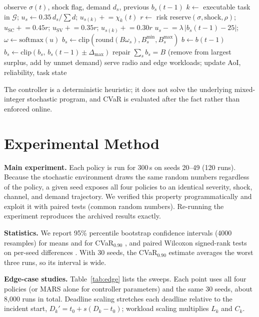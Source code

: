 \documentclass[conference]{IEEEtran}
\begin{document}
\begin{algorithm}[t]
\caption{One MARS control step}
\label{alg:mars}
\small
\begin{algorithmic}[1]
\State observe $\sigma(t)$, shock flag, demand $d_s$, previous $b_s(t-1)$
\State $k\gets$ executable task in $\mathcal{G}$; $u_s\gets 0.35\,d_s/\sum d$; $u_{s(k)}\mathrel{+}=\chi_k(t)$
\State $r\gets$ risk reserve$(\sigma,\text{shock},\rho)$; $u_{\mathrm{SC}}\mathrel{+}=0.45r$; $u_{\mathrm{SV}}\mathrel{+}=0.35r$; $u_{s(k)}\mathrel{+}=0.30r$
\State $u_s\mathrel{-}=\lambda\,|b_s(t-1)-25|$;\quad $\omega\gets\mathrm{softmax}(u)$
\State $b_s\gets\mathrm{clip}(\mathrm{round}(B\omega_s),B_s^{\min},B_s^{\max})$
 $b\gets b(t-1)$
\Else\ $b_s\gets\mathrm{clip}(b_s,\,b_s(t-1)\pm\Delta_{\max})$
\EndIf
\State repair $\sum_s b_s=B$ (remove from largest surplus, add by unmet demand)
\State serve radio and edge workloads; update AoI, reliability, task state
\end{algorithmic}
\end{algorithm}

The controller is a deterministic heuristic; it does not solve the underlying mixed-integer stochastic program, and CVaR is evaluated after the fact rather than enforced online.

\section{Experimental Method}
\textbf{Main experiment.} Each policy is run for 300\,s on seeds 20--49 (120 runs). Because the stochastic environment draws the same random numbers regardless of the policy, a given seed exposes all four policies to an identical severity, shock, channel, and demand trajectory. We verified this property programmatically and exploit it with paired tests (common random numbers). Re-running the experiment reproduces the archived results exactly.

\textbf{Statistics.} We report 95\% percentile bootstrap confidence intervals (4000 resamples) for means and for CVaR$_{0.90}$ \cite{bootstrap}, and paired Wilcoxon signed-rank tests on per-seed differences \cite{wilcoxon}. With 30 seeds, the CVaR$_{0.90}$ estimate averages the worst three runs, so its interval is wide.

\textbf{Edge-case studies.} Table~\ref{tab:edge} lists the sweeps. Each point uses all four policies (or MARS alone for controller parameters) and the same 30 seeds, about 8{,}000 runs in total. Deadline scaling stretches each deadline relative to the incident start, $D_k'=t_0+s(D_k-t_0)$; workload scaling multiplies $L_k$ and $C_k$.
\end{document}
